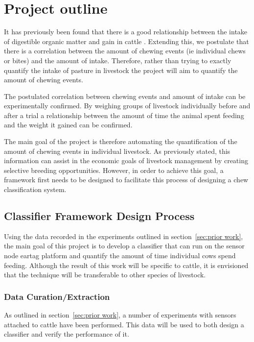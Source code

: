 \chapter{Project outline}
It has previously been found that there is a good relationship between the intake of digestible organic matter and gain in cattle \cite{Lippke1980}. Extending this, we postulate that there is a correlation between the amount of chewing events (ie individual chews or bites) and the amount of intake. Therefore, rather than trying to exactly quantify the intake of pasture in livestock the project will aim to quantify the amount of chewing events. 

The postulated correlation between chewing events and amount of intake can be experimentally confirmed. By weighing groups of livestock individually before and after a trial a relationship between the amount of time the animal spent feeding and the weight it gained can be confirmed. 

The main goal of the project is therefore automating the quantification of the amount of chewing events in individual livestock. As previously stated, this information can assist in the economic goals of livestock management by creating selective breeding opportunities. However, in order to achieve this goal, a framework first needs to be designed to facilitate this process of designing a chew classification system.  

\section{Classifier Framework Design Process}

Using the data recorded in the experiments outlined in section~\ref{sec:prior work}, the main goal of this project is to develop a classifier that can run on the sensor node eartag platform and quantify the amount of time individual cows spend feeding. Although the result of this work will be specific to cattle, it is envisioned that the technique will be transferable to other species of livestock. 


\subsection*{Data Curation/Extraction}
As outlined in  section~\ref{sec:prior work}, a number of experiments with sensors attached to cattle have been performed. This data will be used to both design a classifier and verify the performance of it. 

